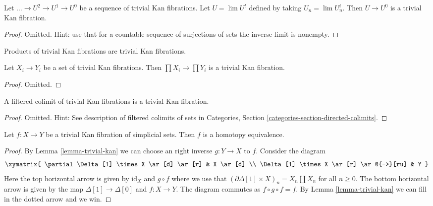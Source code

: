 \begin{lemma}
\label{lemma-limit-trivial-kan}
Let $\ldots \to U^2 \to U^1 \to U^0$ be a sequence of trivial Kan
fibrations. Let $U = \lim U^t$ defined by taking $U_n = \lim U_n^t$.
Then $U \to U^0$ is a trivial Kan fibration.
\end{lemma}

\begin{proof}
Omitted. Hint: use that for a countable sequence of surjections of sets
the inverse limit is nonempty.
\end{proof}

\begin{lemma}
\label{lemma-product-trivial-kan}
\begin{slogan}
Products of trivial Kan fibrations are trivial Kan fibrations.
\end{slogan}
Let $X_i \to Y_i$ be a set of trivial Kan fibrations. Then
$\prod X_i \to \prod Y_i$ is a trivial Kan fibration.
\end{lemma}

\begin{proof}
Omitted.
\end{proof}

\begin{lemma}
\label{lemma-filtered-colimit-trivial-kan}
A filtered colimit of trivial Kan fibrations is a trivial Kan fibration.
\end{lemma}

\begin{proof}
Omitted. Hint: See description of filtered colimits of sets in
Categories, Section \ref{categories-section-directed-colimits}.
\end{proof}

\begin{lemma}
\label{lemma-trivial-kan-homotopy}
Let $f : X \to Y$ be a trivial Kan fibration of simplicial sets.
Then $f$ is a homotopy equivalence.
\end{lemma}

\begin{proof}
By Lemma \ref{lemma-trivial-kan} we can choose an right inverse $g : Y \to X$
to $f$. Consider the diagram
$$
\xymatrix{
\partial \Delta[1] \times X \ar[d] \ar[r] & X \ar[d] \\
\Delta[1] \times X \ar[r] \ar@{-->}[ru] & Y
}
$$
Here the top horizontal arrow is given by $\text{id}_X$ and $g \circ f$
where we use that
$(\partial \Delta[1] \times X)_n = X_n \amalg X_n$ for all $n \geq 0$.
The bottom horizontal arrow is given by the map $\Delta[1] \to \Delta[0]$
and $f : X \to Y$. The diagram commutes as $f \circ g \circ f = f$.
By Lemma \ref{lemma-trivial-kan} we can fill in the dotted arrow
and we win.
\end{proof}







